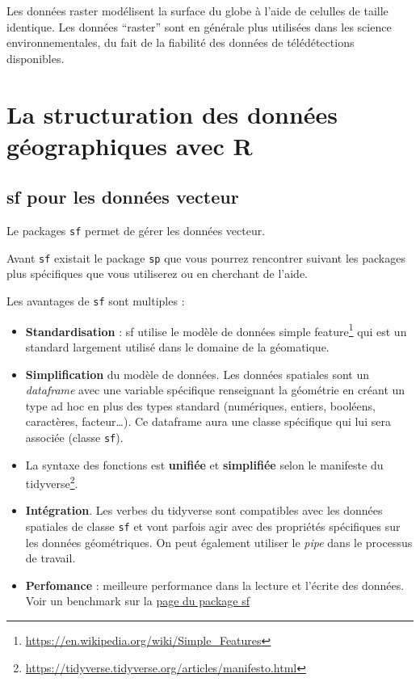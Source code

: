 \documentclass[
]{book}
\begin{document}
Les données raster modélisent la surface du globe à l'aide de celulles de taille identique.
Les données ``raster'' sont en générale plus utilisées dans les science environnementales, du fait de la fiabilité des données de télédétections disponibles.

\hypertarget{la-structuration-des-donnuxe9es-guxe9ographiques-avec-r}{%
\section{La structuration des données géographiques avec R}\label{la-structuration-des-donnuxe9es-guxe9ographiques-avec-r}}

\hypertarget{sf-pour-les-donnuxe9es-vecteur}{%
\subsection{sf pour les données vecteur}\label{sf-pour-les-donnuxe9es-vecteur}}

Le packages \texttt{sf} permet de gérer les données vecteur.

Avant \texttt{sf} existait le package \texttt{sp} que vous pourrez rencontrer suivant les packages plus spécifiques que vous utiliserez ou en cherchant de l'aide.

Les avantages de \texttt{sf} sont multiples :

\begin{itemize}
\item
  \textbf{Standardisation} : sf utilise le modèle de données simple feature\footnote{\url{https://en.wikipedia.org/wiki/Simple_Features}} qui est un standard largement utilisé dans le domaine de la géomatique.
\item
  \textbf{Simplification} du modèle de données. Les données spatiales sont un \emph{dataframe} avec une variable spécifique renseignant la géométrie en créant un type ad hoc en plus des types standard (numériques, entiers, booléens, caractères, facteur\ldots). Ce dataframe aura une classe spécifique qui lui sera associée (classe \texttt{sf}).
\item
  La syntaxe des fonctions est \textbf{unifiée} et \textbf{simplifiée} selon le manifeste du tidyverse\footnote{\url{https://tidyverse.tidyverse.org/articles/manifesto.html}}.
\item
  \textbf{Intégration}. Les verbes du tidyverse sont compatibles avec les données spatiales de classe \texttt{sf} et vont parfois agir avec des propriétés spécifiques sur les données géométriques. On peut également utiliser le \emph{pipe} dans le processus de travail.
\item
  \textbf{Perfomance} : meilleure performance dans la lecture et l'écrite des données. Voir un benchmark sur la \href{https://r-spatial.github.io/sf/articles/sf1.html\#benchmarks}{page du package sf}
\end{itemize}
\end{document}
